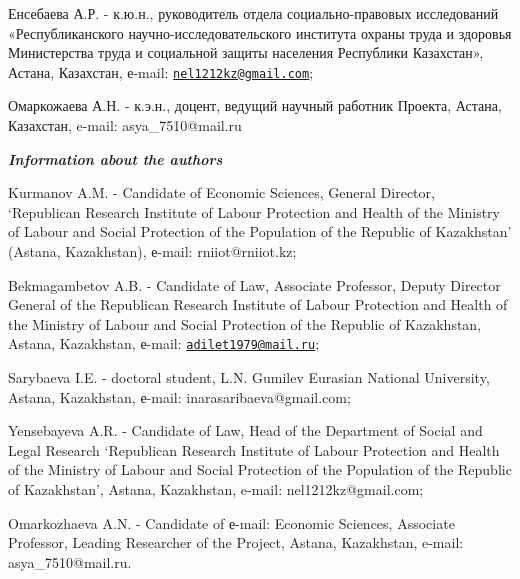 Енсебаева А.Р. - к.ю.н., руководитель отдела социально-правовых
исследований «Республиканского научно-исследовательского института
охраны труда и здоровья Министерства труда и социальной защиты населения
Республики Казахстан», Астана, Казахстан, е-mail:
\href{mailto:nel1212kz@gmail.com}{\nolinkurl{nel1212kz@gmail.com}};

Омаркожаева А.Н. - к.э.н., доцент, ведущий научный работник Проекта,
Астана, Казахстан, e-mail: asya\_7510@mail.ru

\emph{{\bfseries Information about the authors}}

Kurmanov A.M. - Candidate of Economic Sciences, General Director,
`Republican Research Institute of Labour Protection and Health of the
Ministry of Labour and Social Protection of the Population of the
Republic of Kazakhstan' (Astana, Kazakhstan), е-mail: rniiot@rniiot.kz;

Bekmagambetov A.B. - Candidate of Law, Associate Professor, Deputy
Director General of the Republican Research Institute of Labour
Protection and Health of the Ministry of Labour and Social Protection of
the Republic of Kazakhstan, Astana, Kazakhstan, е-mail:
\href{mailto:adilet1979@mail.ru}{\nolinkurl{adilet1979@mail.ru}};

Sarybaeva I.E. - doctoral student, L.N. Gumilev Eurasian National
University, Astana, Kazakhstan, е-mail: inarasaribaeva@gmail.com;

Yensebayeva A.R. - Candidate of Law, Head of the Department of Social
and Legal Research `Republican Research Institute of Labour Protection
and Health of the Ministry of Labour and Social Protection of the
Population of the Republic of Kazakhstan', Astana, Kazakhstan, e-mail:
nel1212kz@gmail.com;

Omarkozhaeva A.N. - Candidate of е-mail: Economic Sciences, Associate
Professor, Leading Researcher of the Project, Astana, Kazakhstan,
e-mail: asya\_7510@mail.ru.